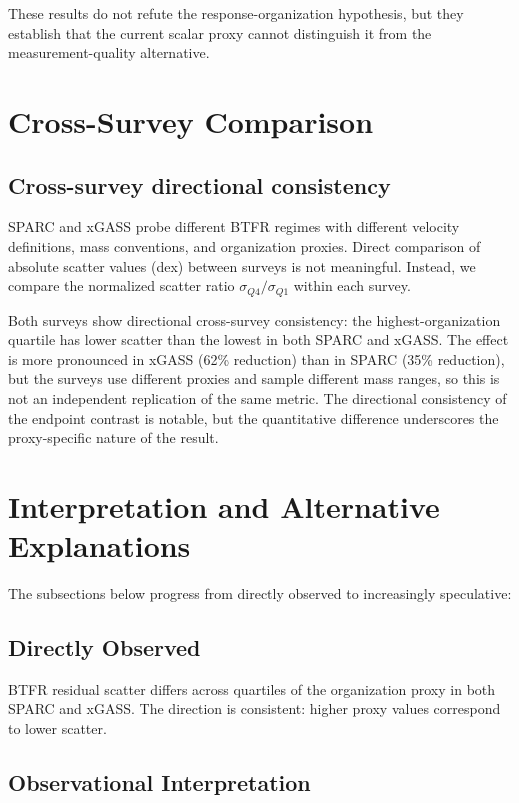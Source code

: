 \documentclass[11pt]{article}
\begin{document}
These results do not refute the response-organization hypothesis, but they establish that the current scalar proxy cannot distinguish it from the measurement-quality alternative.

\section{Cross-Survey Comparison}

\subsection{Cross-survey directional consistency}

SPARC and xGASS probe different BTFR regimes with different velocity definitions, mass conventions, and organization proxies. Direct comparison of absolute scatter values (dex) between surveys is not meaningful. Instead, we compare the normalized scatter ratio $\sigma_{Q4}/\sigma_{Q1}$ within each survey.

Both surveys show directional cross-survey consistency: the highest-organization quartile has lower scatter than the lowest in both SPARC and xGASS. The effect is more pronounced in xGASS (62\% reduction) than in SPARC (35\% reduction), but the surveys use different proxies and sample different mass ranges, so this is not an independent replication of the same metric. The directional consistency of the endpoint contrast is notable, but the quantitative difference underscores the proxy-specific nature of the result.

\section{Interpretation and Alternative Explanations}

The subsections below progress from directly observed to increasingly speculative:

\subsection{Directly Observed}

BTFR residual scatter differs across quartiles of the organization proxy in both SPARC and xGASS. The direction is consistent: higher proxy values correspond to lower scatter.

\subsection{Observational Interpretation}
\end{document}
